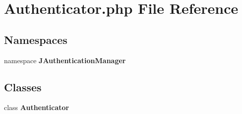 \section{Authenticator.php File Reference}
\label{Authenticator_8php}
\subsection*{Namespaces}
\begin{CompactItemize}
\item 
namespace {\bf JAuthenticationManager}
\end{CompactItemize}
\subsection*{Classes}
\begin{CompactItemize}
\item 
class {\bf Authenticator}
\end{CompactItemize}
